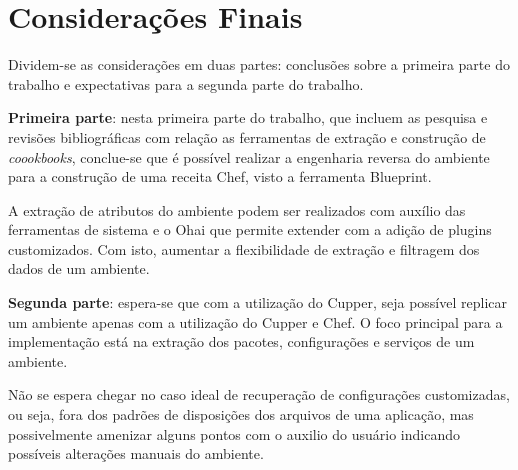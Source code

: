 \newpage\null\thispagestyle{empty}\newpage
\chapter{Considerações Finais}
\label{chap:result-parc}

Dividem-se as considerações em duas partes: conclusões
sobre a primeira parte do trabalho e expectativas para
a segunda parte do trabalho.

\textbf{Primeira parte}: nesta primeira parte do trabalho, que
incluem as pesquisa e revisões bibliográficas com relação
as ferramentas de extração e construção de \textit{coookbooks},
conclue-se que é possível realizar a engenharia reversa do
ambiente para a construção de uma receita Chef, visto a
ferramenta Blueprint.

A extração de atributos do ambiente podem ser realizados
com auxílio das ferramentas de sistema e o Ohai que permite
extender com a adição de plugins customizados. Com isto,
aumentar a flexibilidade de extração e filtragem dos dados
de um ambiente.

\textbf{Segunda parte}: espera-se que com a utilização do Cupper,
seja possível replicar um ambiente apenas com a utilização
do Cupper e Chef. O foco principal para a implementação
está na extração dos pacotes, configurações e serviços
de um ambiente.

Não se espera chegar no caso ideal de
recuperação de configurações customizadas, ou seja, fora
dos padrões de disposições dos arquivos de uma aplicação,
mas possivelmente amenizar alguns pontos com o auxilio do
usuário indicando possíveis alterações manuais do ambiente.


